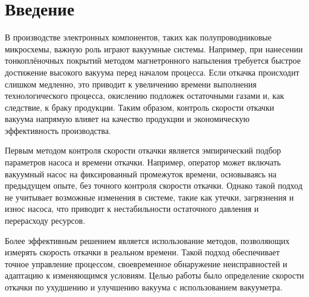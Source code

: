 \chapter{Введение}
\label{ch:intro}



В производстве электронных компонентов, таких как полупроводниковые микросхемы, важную роль играют вакуумные системы. Например, при нанесении тонкоплёночных покрытий методом магнетронного напыления требуется быстрое достижение высокого вакуума перед началом процесса. Если откачка происходит слишком медленно, это приводит к увеличению времени выполнения технологического процесса, окислению подложек остаточными газами и, как следствие, к браку продукции. Таким образом, контроль скорости откачки вакуума напрямую влияет на качество продукции и экономическую эффективность производства.

Первым методом контроля скорости откачки является эмпирический подбор параметров насоса и времени откачки. Например, оператор может включать вакуумный насос на фиксированный промежуток времени, основываясь на предыдущем опыте, без точного контроля скорости откачки. Однако такой подход не учитывает возможные изменения в системе, такие как утечки, загрязнения и износ насоса, что приводит к нестабильности остаточного давления и перерасходу ресурсов.

Более эффективным решением является использование  методов, позволяющих измерять скорость откачки в реальном времени. Такой подход обеспечивает точное управление процессом, своевременное обнаружение неисправностей и адаптацию к изменяющимся условиям. Целью работы было определение скорости откачки по ухудшению и улучшению вакуума с использованием вакууметра.